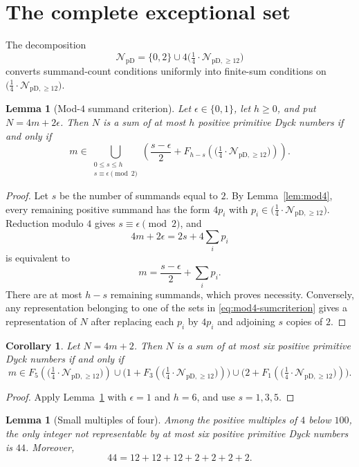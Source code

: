 \documentclass[12pt]{article}
\theoremstyle{plain}
\newtheorem{lemma}[theorem]{Lemma}
\newtheorem{corollary}[theorem]{Corollary}
\theoremstyle{definition}
\theoremstyle{plain}
\newcommand{\NpD}{\mathcal{N}_{\mathrm{pD}}}
\newcommand{\Pset}{%
  \bigl(\tfrac{1}{4}\cdot\mathcal{N}_{\mathrm{pD},\geq 12}\bigr)%
}
\begin{document}
\section{The complete exceptional set}\label{sec:exceptions}

The decomposition
\[
 \NpD=\{0,2\}\cup4\Pset
\]
converts summand-count conditions uniformly into finite-sum conditions on
$\Pset$.

\begin{lemma}[Mod-$4$ summand criterion]\label{lem:mod4-sumcriterion}
Let $\epsilon\in\{0,1\}$, let $h\geq0$, and put
$N=4m+2\epsilon$.  Then $N$ is a sum of at most $h$ positive primitive
Dyck numbers if and only if
\begin{equation}\label{eq:mod4-sumcriterion}
 m\in
 \bigcup_{\substack{0\leq s\leq h\\
                    s\equiv\epsilon\pmod2}}
 \left(
  \frac{s-\epsilon}{2}+F_{h-s}(\Pset)
 \right).
\end{equation}
\end{lemma}

\begin{proof}
Let $s$ be the number of summands equal to $2$.  By
Lemma~\ref{lem:mod4}, every remaining positive summand has the form
$4p_i$ with $p_i\in\Pset$.  Reduction modulo $4$ gives
$s\equiv\epsilon\pmod2$, and
\[
 4m+2\epsilon=2s+4\sum_i p_i
\]
is equivalent to
\[
 m=\frac{s-\epsilon}{2}+\sum_i p_i.
\]
There are at most $h-s$ remaining summands, which proves necessity.
Conversely, any representation belonging to one of the sets in
\eqref{eq:mod4-sumcriterion} gives a representation of $N$ after
replacing each $p_i$ by $4p_i$ and adjoining $s$ copies of $2$.
\end{proof}

\begin{corollary}\label{cor:sixcriterion}
Let $N=4m+2$.  Then $N$ is a sum of at most six positive primitive Dyck
numbers if and only if
\begin{equation}\label{eq:sixcriterion}
 m\in F_5(\Pset)
 \cup\bigl(1+F_3(\Pset)\bigr)
 \cup\bigl(2+F_1(\Pset)\bigr).
\end{equation}
\end{corollary}

\begin{proof}
Apply Lemma~\ref{lem:mod4-sumcriterion} with
$\epsilon=1$ and $h=6$, and use $s=1,3,5$.
\end{proof}

\begin{lemma}[Small multiples of four]\label{lem:smallmultiples}
Among the positive multiples of $4$ below $100$, the only integer not
representable by at most six positive primitive Dyck numbers is $44$.
Moreover,
\[
 44=12+12+12+2+2+2+2.
\]
\end{lemma}
\end{document}
